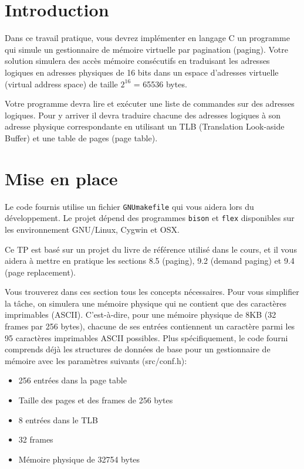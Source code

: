 \documentclass{article}
\begin{document}
\newpage
\section{Introduction}

Dans ce travail pratique, vous devrez implémenter en langage C un programme
qui simule un gestionnaire de mémoire virtuelle par pagination (paging).
Votre solution simulera des accès mémoire consécutifs en traduisant les
adresses logiques en adresses physiques de 16 bits dans un espace d'adresses
virtuelle (virtual address space) de taille $2^{16}$ = 65536 bytes.

Votre programme devra lire et exécuter une liste de commandes sur des adresses
logiques.  Pour y arriver il devra traduire chacune des adresses logiques à son
adresse physique correspondante en utilisant un TLB (Translation Look-aside
Buffer) et une table de pages (page table).

\section{Mise en place}

Le code fournis utilise un fichier \texttt{GNUmakefile} qui vous aidera lors
du développement.  Le projet dépend des programmes \texttt{bison} et
\texttt{flex} disponibles sur les environnement GNU/Linux, Cygwin et OSX.

Ce TP est basé sur un projet du livre de référence utilisé dans le cours, et
il vous aidera à mettre en pratique les sections 8.5 (paging), 9.2 (demand
paging) et 9.4 (page replacement).

Vous trouverez dans ces section tous les concepts nécessaires.  Pour vous
simplifier la tâche, on simulera une mémoire physique qui ne contient que
des caractères imprimables (ASCII).  C'est-à-dire, pour une mémoire physique
de 8KB (32 frames par 256 bytes), chacune de ses entrées contiennent un
caractère parmi les 95 caractères imprimables ASCII possibles.
Plus spécifiquement, le code fourni comprends déjà les structures de données
de base pour un gestionnaire de mémoire avec les paramètres suivants
(src/conf.h):

\begin{itemize}
\item 256 entrées dans la page table
\item Taille des pages et des frames de 256 bytes
\item 8 entrées dans le TLB
\item 32 frames
\item Mémoire physique de 32754 bytes
\end{itemize}
\end{document}
